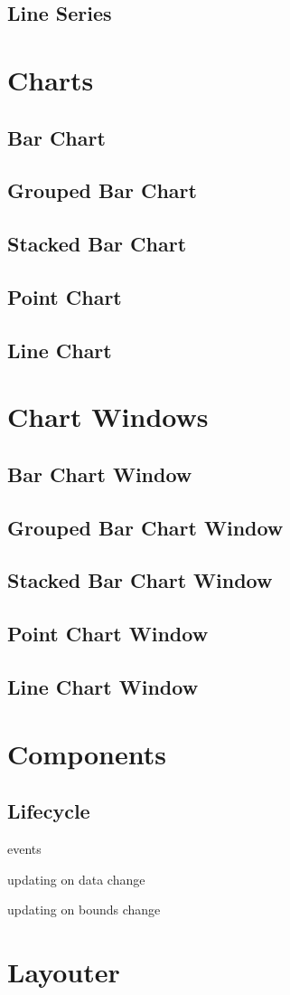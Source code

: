 \subsection{Line Series}

\section{Charts}

\subsection{Bar Chart}
\subsection{Grouped Bar Chart}
\subsection{Stacked Bar Chart}
\subsection{Point Chart}
\subsection{Line Chart}

\section{Chart Windows}

\subsection{Bar Chart Window}
\subsection{Grouped Bar Chart Window}
\subsection{Stacked Bar Chart Window}
\subsection{Point Chart Window}
\subsection{Line Chart Window}

\section{Components}



\subsection{Lifecycle}

events

updating on data change

updating on bounds change

\section{Layouter}